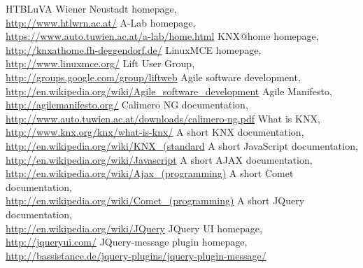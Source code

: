 \begin{thebibliography}{999}
		  HTBLuVA Wiener Neustadt homepage, \\
		  \url{http://www.htlwrn.ac.at/}
		  A-Lab homepage, \\
		  \url{https://www.auto.tuwien.ac.at/a-lab/home.html}
		  KNX@home homepage, \\
		  \url{http://knxathome.fh-deggendorf.de/}
		  LinuxMCE homepage, \\
		  \url{http://www.linuxmce.org/}
         Lift User Group, \\
         \url{http://groups.google.com/group/liftweb}
         Agile software development, \\
         \url{http://en.wikipedia.org/wiki/Agile_software_development}
         Agile Manifesto, \\
         \url{http://agilemanifesto.org/}
         Calimero NG documentation, \\
         \url{http://www.auto.tuwien.ac.at/downloads/calimero-ng.pdf}
         What is KNX, \\
         \url{http://www.knx.org/knx/what-is-knx/}
         A short KNX documentation, \\
         \url{http://en.wikipedia.org/wiki/KNX_(standard}
         A short JavaScript documentation, \\
         \url{http://en.wikipedia.org/wiki/Javascript}
         A short AJAX documentation, \\
         \url{http://en.wikipedia.org/wiki/Ajax_(programming)}
         A short Comet documentation, \\
         \url{http://en.wikipedia.org/wiki/Comet_(programming)}
         A short JQuery documentation, \\
         \url{http://en.wikipedia.org/wiki/JQuery}
         JQuery UI homepage, \\
         \url{http://jqueryui.com/}
         JQuery-message plugin homepage, \\
         \url{http://bassistance.de/jquery-plugins/jquery-plugin-message/}

\end{thebibliography}

